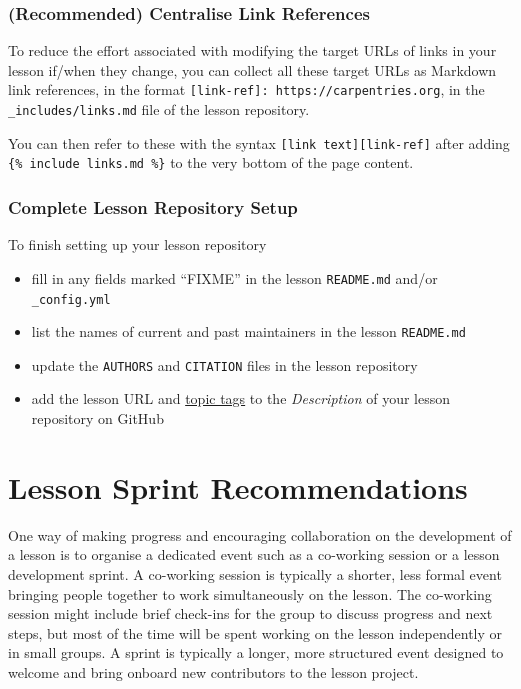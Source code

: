\documentclass[
]{book}
\providecommand{\tightlist}{%
  \setlength{\itemsep}{0pt}\setlength{\parskip}{0pt}}
\begin{document}
\hypertarget{recommended-centralise-link-references}{%
\subsection{(Recommended) Centralise Link References}\label{recommended-centralise-link-references}}

To reduce the effort associated with modifying the target URLs of
links in your lesson if/when they change,
you can collect all these target URLs as Markdown link references,
in the format \texttt{{[}link-ref{]}:\ https://carpentries.org},
in the \texttt{\_includes/links.md} file of the lesson repository.

You can then refer to these with the syntax \texttt{{[}link\ text{]}{[}link-ref{]}}
after adding \texttt{\{\%\ include\ links.md\ \%\}} to the very bottom of the page content.

\hypertarget{complete-lesson-repository-setup}{%
\subsection{Complete Lesson Repository Setup}\label{complete-lesson-repository-setup}}

To finish setting up your lesson repository

\begin{itemize}
\tightlist
\item
  fill in any fields marked ``FIXME'' in the lesson \texttt{README.md} and/or \texttt{\_config.yml}
\item
  list the names of current and past maintainers in the lesson \texttt{README.md}
\item
  update the \texttt{AUTHORS} and \texttt{CITATION} files in the lesson repository
\item
  add the lesson URL and
  \href{https://cdh.carpentries.org/the-carpentries-incubator.html\#topic-tags}{topic tags}
  to the \emph{Description} of your lesson repository on GitHub
\end{itemize}

\hypertarget{lesson-sprint-recommendations}{%
\chapter{Lesson Sprint Recommendations}\label{lesson-sprint-recommendations}}

One way of making progress and encouraging collaboration on the development
of a lesson is to organise a dedicated event such as a co-working session
or a lesson development sprint.
A co-working session is typically a shorter, less formal event bringing
people together to work simultaneously on the lesson.
The co-working session might include brief check-ins for the group to discuss
progress and next steps, but most of the time will be spent working on the lesson
independently or in small groups.
A sprint is typically a longer, more structured event designed to welcome and
bring onboard new contributors to the lesson project.
\end{document}
